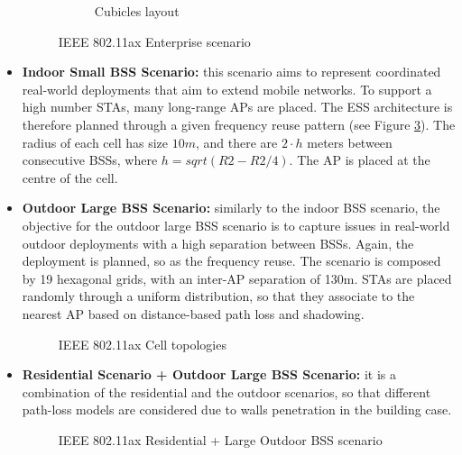 \documentclass[12pt, a4paper,twoside]{tesi_upf}
\begin{document}
\begin{itemize}
\begin{figure}[t!]
\begin{subfigure}[b]{0.4\textwidth}
					\caption{Cubicles layout}
					\label{fig:cubicles}
				\end{subfigure}		
				\caption{IEEE 802.11ax Enterprise scenario}
				\label{fig:ax_enterprise_scenario}
			\end{figure}
		
			\item \textbf{Indoor Small BSS  Scenario:} this scenario aims to represent coordinated real-world deployments that aim to extend mobile networks. To support a high number STAs, many long-range APs are placed. The ESS architecture is therefore planned through a given frequency reuse pattern (see Figure \ref{fig:large_ax}). The radius of each cell has size $10 m$, and there are $2 \cdot h$ meters between consecutive BSSs, where $h=sqrt(R2-R2/4)$. The AP is placed at the centre of the cell.			

			\item \textbf{Outdoor Large BSS Scenario:} similarly to the indoor BSS scenario, the objective for the outdoor large BSS scenario is to capture issues in real-world outdoor deployments with a high separation between BSSs. Again, the deployment is planned, so as the frequency reuse. The scenario is composed by 19 hexagonal grids, with an inter-AP separation of 130m. STAs are placed randomly through a uniform distribution, so that they associate to the nearest AP based on distance-based path loss and shadowing.  
			\begin{figure}[h!]
				\centering
				\caption{IEEE 802.11ax Cell topologies}
				\label{fig:large_ax}
			\end{figure}	
		
			\item \textbf{Residential Scenario + Outdoor Large BSS Scenario:} it is a combination of the residential and the outdoor scenarios, so that different path-loss models are considered due to walls penetration in the building case.
			\begin{figure}[h!]
				\centering
				\caption{IEEE 802.11ax Residential + Large Outdoor BSS scenario}
				\label{fig:residential_large_ax}
			\end{figure}	
		\end{itemize}	
\end{document}

